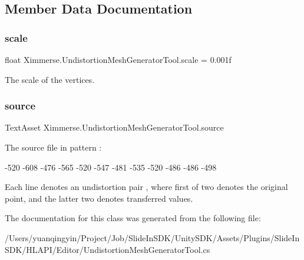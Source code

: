 \subsection{Member Data Documentation}
\mbox{\label{class_ximmerse_1_1_undistortion_mesh_generator_tool_aa6c18c162391d404d2812431d6e1a9c5}} 
\subsubsection{\texorpdfstring{scale}{scale}}
{\footnotesize\ttfamily float Ximmerse.\+Undistortion\+Mesh\+Generator\+Tool.\+scale = 0.\+001f}



The scale of the vertices. 

\mbox{\label{class_ximmerse_1_1_undistortion_mesh_generator_tool_a8f1e6a84db20799ccc581f2d95597349}} 
\subsubsection{\texorpdfstring{source}{source}}
{\footnotesize\ttfamily Text\+Asset Ximmerse.\+Undistortion\+Mesh\+Generator\+Tool.\+source}



The source file in pattern \+: 

-\/520 -\/608 -\/476 -\/565 -\/520 -\/547 -\/481 -\/535 -\/520 -\/486 -\/486 -\/498

Each line denotes an undistortion pair , where first of two denotes the original point, and the latter two denotes transferred values.

The documentation for this class was generated from the following file\+:\begin{DoxyCompactItemize}
\item 
/\+Users/yuanqingyin/\+Project/\+Job/\+Slide\+In\+S\+D\+K/\+Unity\+S\+D\+K/\+Assets/\+Plugins/\+Slide\+In\+S\+D\+K/\+H\+L\+A\+P\+I/\+Editor/Undistortion\+Mesh\+Generator\+Tool.\+cs\end{DoxyCompactItemize}
